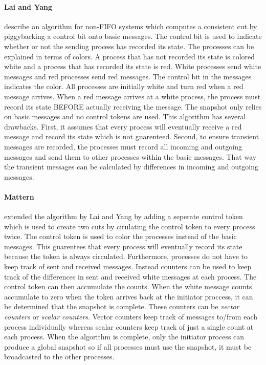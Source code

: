 \documentclass[11pt]{book}
\begin{document}
\paragraph{Lai and Yang}\cite{lai-87} describe an algorithm for non-FIFO systems which
computes a consistent cut by piggybacking a control bit onto basic messages.  The control
bit is used to indicate whether or not the sending process has recorded its state.  The
processes can be explained in terms of colors.  A process that has not recorded its state
is colored white and a process that has recorded its state is red.  White processes send
white messages and red processes send red messages.  The control bit in the messages indicates
the color.  All processes are initially white and turn red when a red message arrives.  When
a red message arrives at a white process, the process must record its state BEFORE actually
receiving the message.  The snapshot only relies on basic messages and no control tokens are
used.  This algorithm has several drawbacks.  First, it assumes that every process will
eventually receive a red message and record its state which is not guarenteed.  Second, to
ensure transient messages are recorded, the processes must record all incoming and outgoing
messages and send them to other processes within the basic messages.  That way the transient
messages can be calculated by differences in incoming and outgoing messages.

\paragraph{Mattern}\cite{mattern-93} extended the algorithm by Lai and Yang by adding a
seperate control token which is used to create two cuts by cirulating the control token to
every process twice.  The control token is used to color the processes instead of the basic
messages.  This guarentees that every process will eventually record its state because the
token is always circulated.  Furthermore, processes do not have to keep track of sent and
received messages.  Instead counters can be used to keep track of the differences in sent
and received white messages at each process.  The control token can then accumulate the
counts.  When the white message counts accumulate to zero when the token arrives back at
the initiator proccess, it can be determined that the snapshot is complete.  These counters
can be \emph{vector counters} or \emph{scalar counters}.  Vector counters keep track of
messages to/from each process individually whereas scalar counters keep track of just a
single count at each process.  When the algorithm is complete, only the initiator process
can produce a global snapshot so if all processes must use the snapshot, it must be broadcasted
to the other processes.
\end{document}
